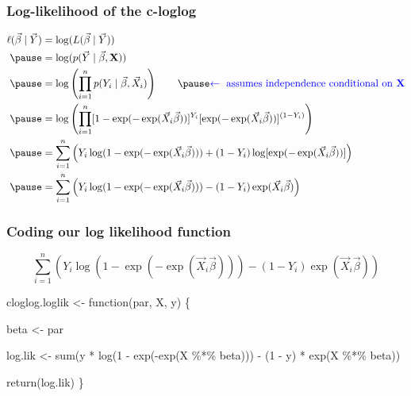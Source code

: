 \documentclass[handout]{beamer}
\newcommand{\blue}[1]{\textcolor{blue}{#1}}
\begin{document}
\begin{frame}
\frametitle{Log-likelihood of the c-loglog}
\pause
\begin{scriptsize}
$$\begin{aligned}
\ell(\vec\beta \mid \vec{Y}) &= \log(L(\vec\beta \mid \vec{Y})) \\ \pause
&= \log(p(\vec{Y}\mid \vec\beta,\mathbf{X})) \\\pause
&= \log\left(\prod_{i=1}^n p(Y_i\mid \vec\beta, \vec{X}_i)\right) \qquad \pause \blue{\leftarrow \text{ assumes independence conditional on }\mathbf{X}} \\\pause
&= \log\left(\prod_{i=1}^n [1 - \exp(-\exp(\vec{X}_i\vec\beta))]^{Y_i}[\exp(-\exp(\vec{X}_i\vec\beta))]^{(1-Y_i)}\right) \\\pause
&= \sum_{i=1}^n \left( Y_i\log(1 - \exp(-\exp(\vec{X}_i\vec\beta))) + (1-Y_i)\log[\exp(-\exp(\vec{X}_i\vec\beta))]\right) \\\pause
&= \sum_{i=1}^n \left( Y_i\log(1 - \exp(-\exp(\vec{X}_i\vec\beta))) - (1-Y_i)\exp(\vec{X}_i\vec\beta)\right) \\
\end{aligned}$$
\end{scriptsize}
\end{frame}

\begin{frame}[fragile]
\frametitle{Coding our log likelihood function}
$$\sum_{i=1}^n \left( Y_i\log(1 - \exp(-\exp(\vec{X}_i\vec\beta))) - (1-Y_i)\exp(\vec{X}_i\vec\beta)\right)$$
\pause

\begin{semiverbatim}
cloglog.loglik <- function(par, X, y) \{
\end{semiverbatim}
\pause
\begin{semiverbatim}
     beta <- par
\end{semiverbatim}
\pause
\begin{semiverbatim}
     log.lik <- sum(y * log(1 - exp(-exp(X \%*\% beta))) -
                   (1 - y) * exp(X \%*\% beta))
\end{semiverbatim}
\pause
\begin{semiverbatim}
  return(log.lik)
\}
\end{semiverbatim}
\end{frame}
\end{document}
